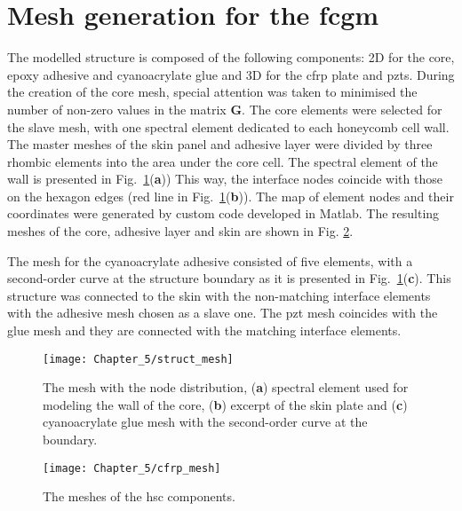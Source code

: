 \section{Mesh generation for the \acs{fcgm}}
\label{sec:honeycomb}

The modelled structure is composed of the following components: 2D for the core, epoxy adhesive and cyanoacrylate glue and 3D for the \ac{cfrp} plate and \acp{pzt}.
During the creation of the core mesh, special attention was taken to minimised the number of non-zero values in the matrix \(\textbf{G}\).
The core elements were selected for the slave mesh, with one spectral element dedicated to each honeycomb cell wall.
The master meshes of the skin panel and adhesive layer were divided by three rhombic elements into the area under the core cell.
The spectral element of the wall is presented in Fig.~\ref{fig:struct_mesh}(\textbf{a}))
This way, the interface nodes coincide with those on the hexagon edges (red line in Fig.~\ref{fig:struct_mesh}(\textbf{b})).
The map of element nodes and their coordinates were generated by custom code developed in Matlab.
The resulting meshes of the core, adhesive layer and skin are shown in Fig. \ref{fig:cas_mesh}.

The mesh for the cyanoacrylate adhesive consisted of five elements, with a second-order curve at the structure boundary as it is presented in Fig.~\ref{fig:struct_mesh}(\textbf{c}).
This structure was connected to the skin with the non-matching interface elements with the adhesive mesh chosen as a slave one.
The \ac{pzt} mesh coincides with the glue mesh and they are connected with the matching interface elements.
\begin{figure}[H]
	\begin{center}
		\texttt{[image: Chapter\_5/struct\_mesh]}
	\end{center}
	\caption{The mesh with the node distribution, (\textbf{a}) spectral element used for modeling the wall of the core, (\textbf{b}) excerpt of the skin plate and (\textbf{c}) cyanoacrylate glue mesh with the second-order curve at the boundary.}
	\label{fig:struct_mesh}
\end{figure}
\begin{figure}[H]
	\begin{center}
		\texttt{[image: Chapter\_5/cfrp\_mesh]}
	\end{center}
	\caption{The meshes of the \acf{hsc} components.}
	\label{fig:cas_mesh}
\end{figure}

